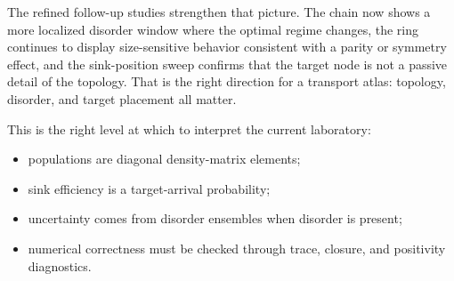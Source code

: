 \documentclass[11pt,a4paper]{article}
\begin{document}
The refined follow-up studies strengthen that picture. The chain now shows a
more localized disorder window where the optimal regime changes, the ring
continues to display size-sensitive behavior consistent with a parity or
symmetry effect, and the sink-position sweep confirms that the target node is
not a passive detail of the topology. That is the right direction for a
transport atlas: topology, disorder, and target placement all matter.

This is the right level at which to interpret the current laboratory:
\begin{itemize}
  \item populations are diagonal density-matrix elements;
  \item sink efficiency is a target-arrival probability;
  \item uncertainty comes from disorder ensembles when disorder is present;
  \item numerical correctness must be checked through trace, closure, and positivity diagnostics.
\end{itemize}



\end{document}
